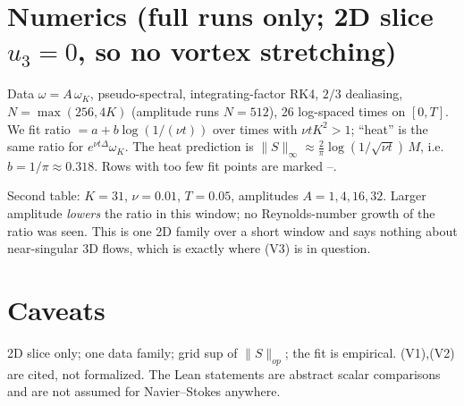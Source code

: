 \documentclass[11pt]{article}
\theoremstyle{definition}\newtheorem{definition}{Definition}
\begin{document}
\section{Numerics (full runs only; 2D slice $u_3=0$, so no vortex stretching)}
Data $\omega=A\,\omega_K$, pseudo-spectral, integrating-factor RK4, $2/3$ dealiasing, $N=\max(256,4K)$ (amplitude runs $N=512$), 26 log-spaced times on $[0,T]$. We fit ratio $=a+b\log(1/(\nu t))$ over times with $\nu tK^2>1$; ``heat'' is the same ratio for $e^{\nu t\Delta}\omega_K$. The heat prediction is $\|S\|_\infty\approx\tfrac2\pi\log(1/\sqrt{\nu t})\,M$, i.e.\ $b=1/\pi\approx0.318$. Rows with too few fit points are marked --.

Second table: $K=31$, $\nu=0.01$, $T=0.05$, amplitudes $A=1,4,16,32$. Larger amplitude \emph{lowers} the ratio in this window; no Reynolds-number growth of the ratio was seen. This is one 2D family over a short window and says nothing about near-singular 3D flows, which is exactly where (V3) is in question.

\section{Caveats}
2D slice only; one data family; grid sup of $\|S\|_{op}$; the fit is empirical. (V1),(V2) are cited, not formalized. The Lean statements are abstract scalar comparisons and are not assumed for Navier--Stokes anywhere.
\end{document}
